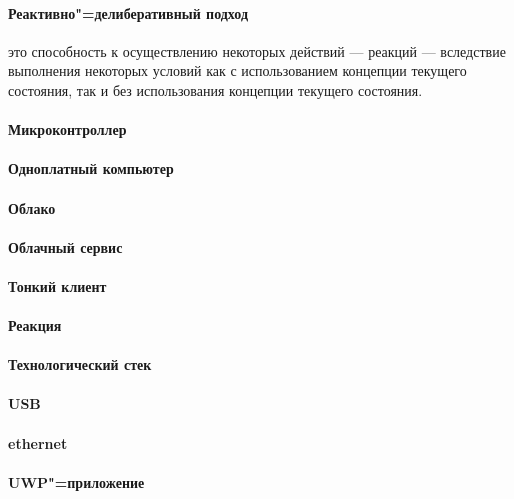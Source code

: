 \paragraph*{Реактивно"=делиберативный подход} это способность к осуществлению некоторых действий --- реакций --- вследствие выполнения некоторых условий как с использованием концепции текущего состояния, так и без использования концепции текущего состояния.

\paragraph*{Микроконтроллер}

\paragraph*{Одноплатный компьютер}

\paragraph*{Облако}

\paragraph*{Облачный сервис}

\paragraph*{Тонкий клиент}

\paragraph*{Реакция}

\paragraph*{Технологический стек}

\paragraph*{USB}

\paragraph*{ethernet}

\paragraph*{UWP"=приложение}
